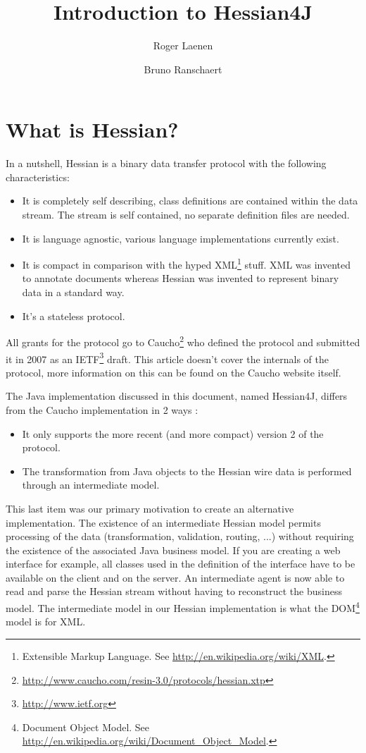 \documentclass[a4paper]{article}
\title{Introduction to Hessian4J}
\author{Roger Laenen \and Bruno Ranschaert}
\begin{document}
\maketitle
\tableofcontents

\section{What is Hessian?}

In a nutshell, Hessian is a binary data transfer protocol with the following characteristics:

\begin{itemize}
	\item It is completely self describing, class definitions are contained within the data stream. The stream is self contained, no separate definition files are needed. 
	\item It is language agnostic, various language implementations currently exist. 
	\item It is compact in comparison with the hyped XML\footnote{Extensible Markup Language. See \url{http://en.wikipedia.org/wiki/XML}.} stuff. XML was invented to annotate documents whereas Hessian was invented to represent binary data in a standard way.
	\item It's a stateless protocol.
\end{itemize}

All grants for the protocol go to Caucho\footnote{\url{http://www.caucho.com/resin-3.0/protocols/hessian.xtp}} who defined the protocol and submitted it in 2007 as an IETF\footnote{\url{http://www.ietf.org}} draft. This article doesn't cover the internals of the protocol, more information on this can be found on the Caucho website itself.

The Java implementation discussed in this document, named Hessian4J, differs from the Caucho implementation in 2 ways :

\begin{itemize}
	\item It only supports the more recent (and more compact) version 2 of the protocol.
	\item The transformation from Java objects to the Hessian wire data is performed through an intermediate model. 
\end{itemize}

This last item was our primary motivation to create an alternative implementation. The existence of an intermediate Hessian model permits processing of the data (transformation, validation, routing, ...) without requiring the existence of the associated Java business model. If you are creating a web interface for example, all classes used in the definition of the interface have to be available on the client and on the server. An intermediate agent is now able to read and parse the Hessian stream without having to reconstruct the business model. The intermediate model in our Hessian implementation is what the DOM\footnote{Document Object Model. See \url{http://en.wikipedia.org/wiki/Document_Object_Model}.} model is for XML.
\end{document}
